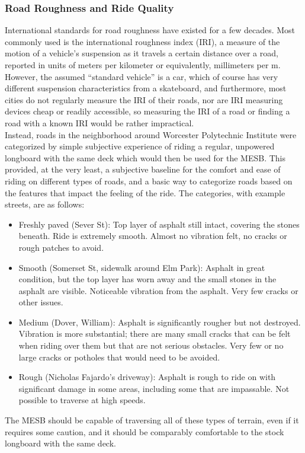 \documentclass[titlepage, letterpaper,12pt]{article}
\begin{document}
\subsubsection{Road Roughness and Ride Quality}
International standards for road roughness have existed for a few decades. Most commonly used is the international roughness index (IRI), a measure of the motion of a vehicle's suspension as it travels a certain distance over a road, reported in units of meters per kilometer or equivalently, millimeters per m. However, the assumed ``standard vehicle'' is a car, which of course has very different suspension characteristics from a skateboard, and furthermore, most cities do not regularly measure the IRI of their roads, nor are IRI measuring devices cheap or readily accessible, so measuring the IRI of a road or finding a road with a known IRI would be rather impractical. \\
Instead, roads in the neighborhood around Worcester Polytechnic Institute were categorized by simple subjective experience of riding a regular, unpowered longboard with the same deck which would then be used for the MESB. This provided, at the very least, a subjective baseline for the comfort and ease of riding on different types of roads, and a basic way to categorize roads based on the features that impact the feeling of the ride. The categories, with example streets, are as follows:
\begin{itemize}
 \item Freshly paved (Sever St): Top layer of asphalt still intact, covering the stones beneath. Ride is extremely smooth. Almost no vibration felt, no cracks or rough patches to avoid.
 \item Smooth (Somerset St, sidewalk around Elm Park): Asphalt in great condition, but the top layer has worn away and the small stones in the asphalt are visible. Noticeable vibration from the asphalt. Very few cracks or other issues.
 \item Medium (Dover, William): Asphalt is significantly rougher but not destroyed. Vibration is more substantial; there are many small cracks that can be felt when riding over them but that are not serious obstacles. Very few or no large cracks or potholes that would need to be avoided.
 \item Rough (Nicholas Fajardo’s driveway): Asphalt is rough to ride on with significant damage in some areas, including some that are impassable. Not possible to traverse at high speeds.
\end{itemize}
The MESB should be capable of traversing all of these types of terrain, even if it requires some caution, and it should be comparably comfortable to the stock longboard with the same deck.
\end{document}
